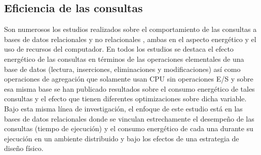 \documentclass[12pt, letter paper]{report}
\begin{document}
      \subsection{Eficiencia de las consultas} %
      \label{sub:eficiencia_de_las_consultas}
        Son numerosos los estudios realizados sobre el comportamiento de las
        consultas a bases de datos relacionales \cite{xuexploring2010,
        langtowards2009, langrethinking2011, niemanndoes2013,
        niemannevaluating2013, pisharathreducing2004, mahajanimproving2019,
        roukhenergy-aware2016} y no relacionales \cite{duarteevaluating2018,
        mahajanenergy2017, mahajanimproving2019, guoenergy-efficient2023,
        shahcomprehensive2022, foschinisql2023, gomesenergy2016,
        gomesnosql-based2023, guoenergy2024, subramaniamenergy2015,
        niemanntowards2016}, ambas en el aspecto energético y el uso de recursos
        del computador. En todos los estudios se destaca el efecto energético de
        las consultas en términos de las operaciones elementales de una base de
        datos (lectura, inserciones, eliminaciones y modificaciones) así como
        operaciones de agregación que solamente usan CPU sin operaciones E/S y
        sobre esa misma base se han publicado resultados sobre el consumo
        energético de tales consultas y el efecto que tienen diferentes
        optimizaciones \cite{langrethinking2011, duarteevaluating2018,
        pisharathreducing2004, macdonaldefficient2017, mahajanenergy2017,
        mahajanimproving2019} sobre dicha variable. Bajo esta misma línea de
        investigación, el enfoque de este estudio está en las bases de datos
        relacionales donde se vinculan estrechamente el desempeño de las
        consultas (tiempo de ejecución) y el consumo energético de cada una
        durante su ejecución en un ambiente distribuido y bajo los efectos de
        una estrategia de diseño físico.
\end{document}
